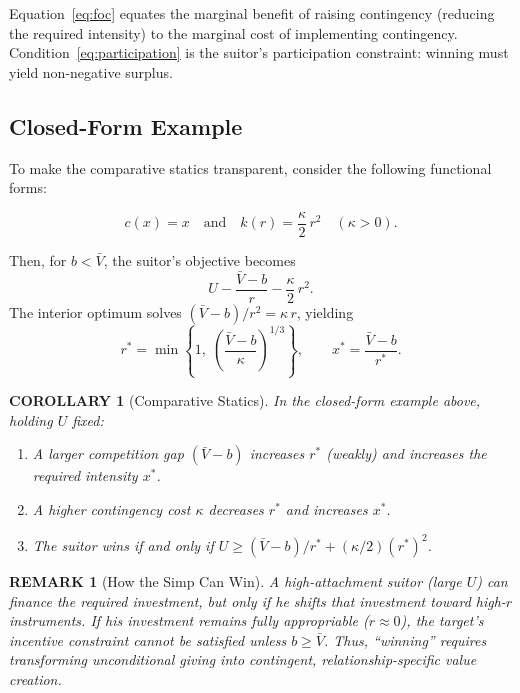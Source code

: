 \documentclass[AER]{AEA}
\newtheorem{corollary}{COROLLARY}
\newtheorem{remark}{REMARK}
\begin{document}
Equation~\eqref{eq:foc} equates the marginal benefit of raising contingency (reducing the required intensity) to the marginal cost of implementing contingency.
Condition~\eqref{eq:participation} is the suitor's participation constraint: winning must yield non-negative surplus.

\subsection{Closed-Form Example}

To make the comparative statics transparent, consider the following functional forms:

\[
c(x)=x
\quad\text{and}\quad
k(r)=\frac{\kappa}{2}\,r^2
\quad (\kappa>0).
\]

Then, for $b<\bar{V}$, the suitor's objective becomes
\[
U - \frac{\bar{V}-b}{r} - \frac{\kappa}{2}\,r^2.
\]
The interior optimum solves $(\bar{V}-b)/r^2=\kappa\, r$, yielding
\begin{equation}\label{eq:rclosed}
r^*=\min\left\{1,\;\left(\frac{\bar{V}-b}{\kappa}\right)^{1/3}\right\},
\qquad
x^*=\frac{\bar{V}-b}{r^*}.
\end{equation}

\begin{corollary}[Comparative Statics]\label{cor:comparative}
In the closed-form example above, holding $U$ fixed:
\begin{enumerate}[leftmargin=0.75in]
\item A larger competition gap $(\bar{V}-b)$ increases $r^*$ (weakly) and increases the required intensity $x^*$.
\item A higher contingency cost $\kappa$ decreases $r^*$ and increases $x^*$.
\item The suitor wins if and only if $U \ge (\bar{V}-b)/r^* + (\kappa/2)(r^*)^2$.
\end{enumerate}
\end{corollary}

\begin{remark}[How the Simp Can Win]
A high-attachment suitor (large $U$) can finance the required investment, but \emph{only} if he shifts that investment toward high-$r$ instruments.
If his investment remains fully appropriable ($r\approx 0$), the target's incentive constraint cannot be satisfied unless $b\ge \bar{V}$.
Thus, ``winning'' requires transforming unconditional giving into contingent, relationship-specific value creation.
\end{remark}
\end{document}
